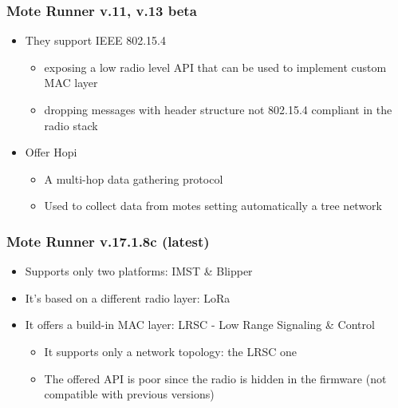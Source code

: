 \begin{frame}[fragile]
  \frametitle{Mote Runner v.11, v.13 beta}
  \begin{itemize}
    \item They support IEEE 802.15.4
    \begin{itemize}
    	\item exposing a low radio level API that can be used to implement custom MAC layer
    	\item dropping messages with header structure not 802.15.4 compliant in the radio stack 
    \end{itemize}
    \item Offer Hopi
    \begin{itemize}
    	\item A multi-hop data gathering protocol
    	\item Used to collect data from motes setting automatically a tree network
    \end{itemize}
  \end{itemize}
\end{frame}

\begin{frame}[fragile]
  \frametitle{Mote Runner v.17.1.8c (latest)}
  \begin{itemize}
    \item Supports only two platforms: IMST \& Blipper
    \item It’s based on a different radio layer: LoRa\texttrademark
    \item It offers a build-in MAC layer: LRSC - Low Range Signaling \& Control
    \begin{itemize}
    	\item It supports only a network topology: the LRSC one
    	\item The offered API is poor since the radio is hidden in the firmware (not compatible with previous versions)
    \end{itemize}

  \end{itemize}
\end{frame}

